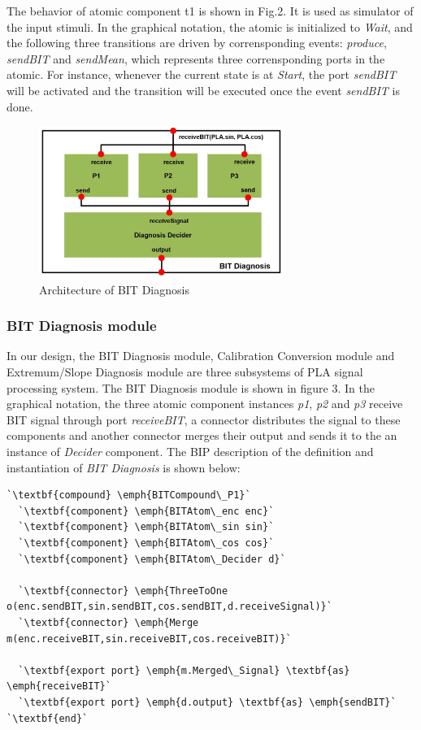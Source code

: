 The behavior of atomic component t1 is shown in Fig.2. It is used as simulator of the input stimuli. In the graphical notation, the atomic is initialized to \emph{Wait}, and the following three transitions are driven by corrensponding events: \emph{produce}, \emph{sendBIT} and \emph{sendMean}, which represents three corrensponding ports in the atomic. For instance, whenever the current state is at \emph{Start}, the port \emph{sendBIT} will be activated and the transition will be executed once the event \emph{sendBIT} is done.

\begin{figure}[ht!]
	\centering
	\includegraphics[width=80mm]{figure/figure4.jpg}
	\caption{Architecture of BIT Diagnosis}
	\label{BIT_Model}
\end{figure}

\subsubsection{BIT Diagnosis module}


\noindent In our design, the BIT Diagnosis module, Calibration Conversion module and Extremum/Slope Diagnosis module are three subsystems of PLA signal processing system. The BIT Diagnosis module is shown in figure 3. In the graphical notation, the three atomic component instances \emph{p1}, \emph{p2} and \emph{p3} receive BIT signal through port \emph{receiveBIT}, a connector distributes the signal to these components and another connector merges their output and sends it to the an instance of \emph{Decider} component. The BIP description of the definition and instantiation of \emph{BIT Diagnosis} is shown below:

\begin{lstlisting}
`\textbf{compound} \emph{BITCompound\_P1}`
  `\textbf{component} \emph{BITAtom\_enc enc}`
  `\textbf{component} \emph{BITAtom\_sin sin}`
  `\textbf{component} \emph{BITAtom\_cos cos}`
  `\textbf{component} \emph{BITAtom\_Decider d}`

  `\textbf{connector} \emph{ThreeToOne o(enc.sendBIT,sin.sendBIT,cos.sendBIT,d.receiveSignal)}`
  `\textbf{connector} \emph{Merge m(enc.receiveBIT,sin.receiveBIT,cos.receiveBIT)}`

  `\textbf{export port} \emph{m.Merged\_Signal} \textbf{as} \emph{receiveBIT}`
  `\textbf{export port} \emph{d.output} \textbf{as} \emph{sendBIT}`
`\textbf{end}`
\end{lstlisting}

